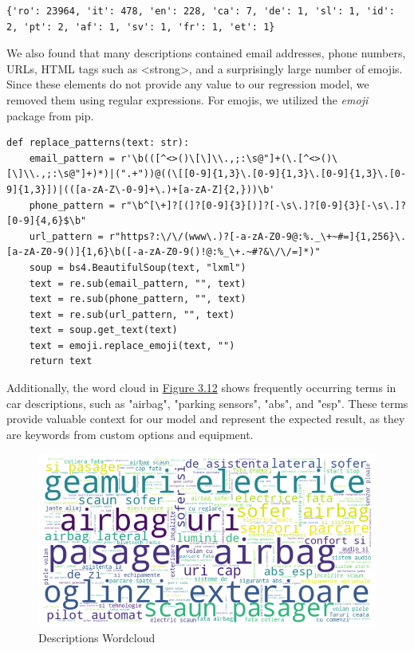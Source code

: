 \begin{lstlisting}[label={lst:langs}]
{'ro': 23964, 'it': 478, 'en': 228, 'ca': 7, 'de': 1, 'sl': 1, 'id': 2, 'pt': 2, 'af': 1, 'sv': 1, 'fr': 1, 'et': 1}
\end{lstlisting}

We also found that many descriptions contained email addresses, phone numbers, URLs, HTML tags such as <strong>, and a surprisingly large number of emojis. Since these elements do not provide any value to our regression model, we removed them using regular expressions. For emojis, we utilized the \textit{emoji} \cite{emoji} package from pip.

\begin{listing}[H]
\begin{lstlisting}
def replace_patterns(text: str):
    email_pattern = r'\b(([^<>()\[\]\\.,;:\s@"]+(\.[^<>()\[\]\\.,;:\s@"]+)*)|(".+"))@((\[[0-9]{1,3}\.[0-9]{1,3}\.[0-9]{1,3}\.[0-9]{1,3}])|(([a-zA-Z\-0-9]+\.)+[a-zA-Z]{2,}))\b'
    phone_pattern = r"\b^[\+]?[(]?[0-9]{3}[)]?[-\s\.]?[0-9]{3}[-\s\.]?[0-9]{4,6}$\b"
    url_pattern = r"https?:\/\/(www\.)?[-a-zA-Z0-9@:%._\+~#=]{1,256}\.[a-zA-Z0-9()]{1,6}\b([-a-zA-Z0-9()!@:%_\+.~#?&\/\/=]*)"
    soup = bs4.BeautifulSoup(text, "lxml")
    text = re.sub(email_pattern, "", text)
    text = re.sub(phone_pattern, "", text)
    text = re.sub(url_pattern, "", text)
    text = soup.get_text(text)
    text = emoji.replace_emoji(text, "")
    return text
\end{lstlisting}
\end{listing}

Additionally, the word cloud in \hyperref[fig:wordcloud]{Figure 3.12} shows frequently occurring terms in car descriptions, such as "airbag", "parking sensors", "abs", and "esp". These terms provide valuable context for our model and represent the expected result, as they are keywords from custom options and equipment.

\begin{figure}[ht]
    \centering
    \includegraphics[width=\linewidth]{images/priceprediction/data/wordcloud.png}
    \caption{Descriptions Wordcloud}
    \label{fig:wordcloud}
\end{figure}



